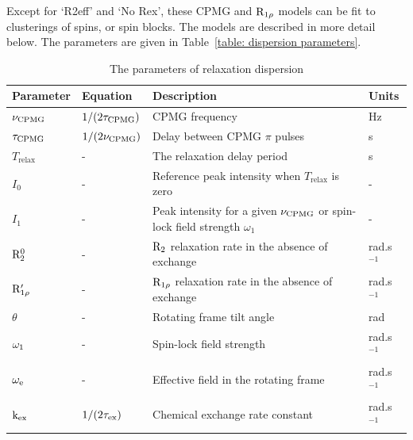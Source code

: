 Except for `R2eff' and `No Rex', these CPMG and $\mathrm{R}_{1\rho}$ models can be fit to clusterings of spins, or spin blocks.
The models are described in more detail below.
The parameters are given in Table~\ref{table: dispersion parameters}.

\begin{table}
\begin{center}
\caption{The parameters of relaxation dispersion}
\begin{tabular}{llll}
\toprule
Parameter               & Equation              & Description                                                                   & Units \\
\midrule
$\nu_\textrm{CPMG}$               & $1 / (2 \tau_\textrm{CPMG})$    & CPMG frequency                                                                & Hz \\
$\tau_\textrm{CPMG}$              & $1 / (2 \nu_\textrm{CPMG})$     & Delay between CPMG $\pi$ pulses                                               & s \\
$T_\textrm{relax}$      & -                     & The relaxation delay period                                                   & s \\
$I_0$                   & -                     & Reference peak intensity when $T_\textrm{relax}$ is zero                      & - \\
$I_1$                   & -                     & Peak intensity for a given $\nu_\textrm{CPMG}$ or spin-lock field strength $\omega_1$   & - \\
$\mathrm{R}_2^0$             & -                     & $\mathrm{R}_2$ relaxation rate in the absence of exchange                            & rad.s$^{-1}$ \\
$\mathrm{R}_{1\rho}'$         & -                     & $\mathrm{R}_{1\rho}$ relaxation rate in the absence of exchange                         & rad.s$^{-1}$ \\
$\theta$                & -                     & Rotating frame tilt angle                                                     & rad \\
$\omega_1$             & -                     & Spin-lock field strength                                                      & rad.s$^{-1}$ \\
$\omega_\textrm{e}$               & -                     & Effective field in the rotating frame                                         & rad.s$^{-1}$ \\
$\textrm{k}_\textrm{ex}$                  & $1 / (2 \tau_\textrm{ex})$        & Chemical exchange rate constant                                               & rad.s$^{-1}$ \\

\end{tabular}
\end{center}
\end{table}
